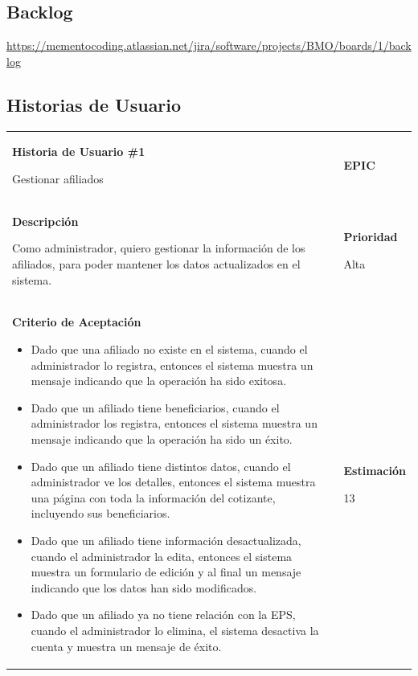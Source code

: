 \documentclass[12pt,a4paper]{article}
\begin{document}
\subsection{Backlog}
\url{https://mementocoding.atlassian.net/jira/software/projects/BMO/boards/1/backlog}
\subsection{Historias de Usuario}
\begin{center}
\begin{tabular}{|>{\columncolor[RGB]{215, 215, 215}} p{10cm} >{\columncolor[RGB]{215, 215, 215}} c >{\columncolor[RGB]{215, 215, 215}} p{2.5cm}|}
\hline 
\textbf{Historia de Usuario \#1}

Gestionar afiliados & & \textbf{{\Large EPIC}} \\ 
\textbf{Descripción}

Como administrador, quiero gestionar la información de los afiliados, para poder mantener los datos actualizados en el sistema. &  & \textbf{Prioridad}

Alta\\

\textbf{Criterio de Aceptación}

\begin{itemize}
\item Dado que una afiliado no existe en el sistema, cuando el administrador lo registra, entonces el sistema muestra un mensaje indicando que la operación ha sido exitosa.
\item Dado que un afiliado tiene beneficiarios, cuando el administrador los registra, entonces el sistema muestra un mensaje indicando que la operación ha sido un éxito.
\item Dado que un afiliado tiene distintos datos, cuando el administrador ve los detalles, entonces el sistema muestra una página con toda la información del cotizante, incluyendo sus beneficiarios.
\item Dado que un afiliado tiene información desactualizada, cuando el administrador la edita, entonces el sistema muestra un formulario de edición y al final un mensaje indicando que los datos han sido modificados.
\item Dado que un afiliado ya no tiene relación con la EPS, cuando el administrador lo elimina, el sistema desactiva la cuenta y muestra un mensaje de éxito.
\end{itemize} & & \textbf{Estimación}

13 \\ 


\end{tabular}
\end{center}
\end{document}
